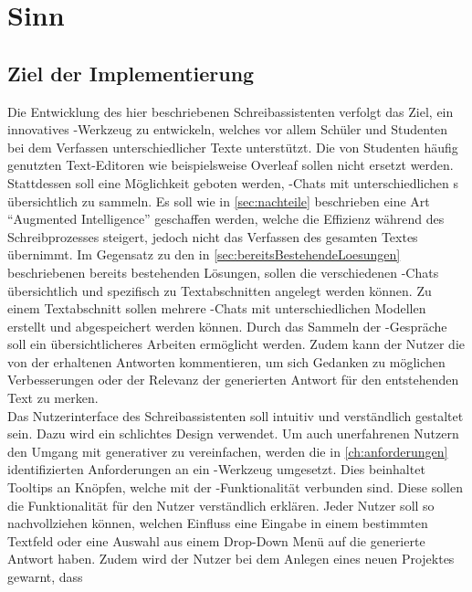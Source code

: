 \documentclass[../main.tex]{subfiles}
\begin{document}
\section{Sinn}

\subsection{Ziel der Implementierung}

Die Entwicklung des hier beschriebenen Schreibassistenten verfolgt das Ziel, ein innovatives -Werkzeug zu entwickeln, welches vor allem Schüler und Studenten bei dem Verfassen 
unterschiedlicher Texte unterstützt. Die von Studenten häufig genutzten Text-Editoren wie beispielsweise Overleaf sollen nicht ersetzt werden. Stattdessen soll eine Möglichkeit geboten werden, 
-Chats mit unterschiedlichen s übersichtlich zu sammeln. Es soll wie in \autoref{sec:nachteile} beschrieben eine Art "`Augmented Intelligence"' geschaffen werden, welche die Effizienz während des Schreibprozesses 
steigert, jedoch nicht das Verfassen des gesamten Textes übernimmt. Im Gegensatz zu den in \autoref{sec:bereitsBestehendeLoesungen} beschriebenen bereits bestehenden Lösungen, sollen die verschiedenen -Chats 
übersichtlich und spezifisch zu Textabschnitten angelegt werden können. Zu einem Textabschnitt sollen mehrere -Chats mit unterschiedlichen Modellen erstellt und abgespeichert 
werden können. Durch das Sammeln der -Gespräche soll ein übersichtlicheres Arbeiten ermöglicht werden. Zudem kann der Nutzer die von der  erhaltenen Antworten kommentieren, um 
sich Gedanken zu möglichen Verbesserungen oder der Relevanz der generierten Antwort für den entstehenden Text zu merken.\\
Das Nutzerinterface des Schreibassistenten soll intuitiv und verständlich gestaltet sein. Dazu wird ein schlichtes Design verwendet. Um auch unerfahrenen Nutzern den Umgang mit 
generativer  zu vereinfachen, werden die in \autoref{ch:anforderungen} identifizierten Anforderungen an ein -Werkzeug umgesetzt. Dies beinhaltet Tooltips an Knöpfen, welche mit der 
-Funktionalität verbunden sind. Diese sollen die Funktionalität für den Nutzer verständlich erklären. Jeder Nutzer soll so nachvollziehen können, welchen Einfluss eine Eingabe in 
einem bestimmten Textfeld oder eine Auswahl aus einem Drop-Down Menü auf die generierte Antwort haben. Zudem wird der Nutzer bei dem Anlegen eines neuen Projektes gewarnt, dass 
\end{document}

